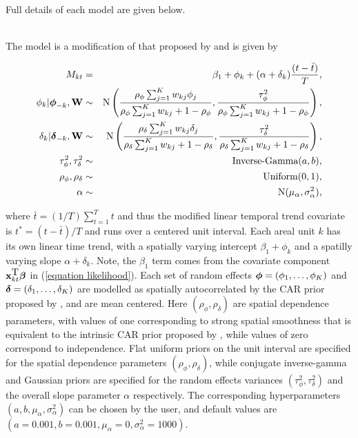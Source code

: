 \documentclass[article,shortnames,nojss]{jss}
\newcommand{\bd}[1]{\ensuremath{\mbox{\boldmath $#1$}}}
\begin{document}
Full details of each model are given below.\vspace{1cm}

\\
The model is a modification of that proposed by \cite{bernardinelli1995} and is given by

\begin{eqnarray}
M_{kt}&=&\beta_{1} + \phi_k + (\alpha + \delta_k)\frac{(t - \bar{t})}{T},\label{carlinear}\\
\phi_k|\bd{\phi}_{-k},\mathbf{W}&\sim&\mbox{N}\left(\frac{\rho_{\phi}\sum_{j=1}^Kw_{kj}\phi_j}{\rho_{\phi}\sum_{j=1}^Kw_{kj} + 1-\rho_{\phi}}, \frac{\tau^2_{\phi}}{\rho_{\phi}\sum_{j=1}^Kw_{kj} + 1-\rho_{\phi}}\right),\nonumber\\
\delta_k|\bd{\delta}_{-k},\mathbf{W}&\sim&\mbox{N}\left(\frac{\rho_{\delta}\sum_{j=1}^Kw_{kj}\delta_j}{\rho_{\delta}\sum_{j=1}^Kw_{kj} + 1-\rho_{\delta}}, \frac{\tau^2_{\delta}}{\rho_{\delta}\sum_{j=1}^Kw_{kj} + 1-\rho_{\delta}}\right),\nonumber\\
\tau^2_{\phi}, \tau^2_{\delta}&\sim&\mbox{Inverse-Gamma}(a,b),\nonumber\\
\rho_{\phi},\rho_{\delta}&\sim&\mbox{Uniform}(0,1),\nonumber\\
\alpha&\sim&\mbox{N}(\mu_{\alpha}, \sigma^2_{\alpha}),\nonumber
\end{eqnarray}

where $\bar{t}=(1/T)\sum_{t=1}^T t$ and thus the modified linear temporal trend covariate is $t^{*}=(t - \bar{t})/T$ and runs over a centered unit interval.  Each areal unit $k$ has its own linear time trend, with a spatially varying intercept $\beta_{1}+\phi_{k}$ and a spatilly varying slope $\alpha+\delta_{k}$. Note, the $\beta_1$ term comes from the covariate component $\mathbf{x}_{kt}^{\mbox{T}}\bd{\beta}$ in (\ref{equation likelihood}). Each set of random effects $\bd{\phi}=(\phi_1,\ldots,\phi_K)$ and  $\bd{\delta}=(\delta_1,\ldots,\delta_K)$ are modelled as spatially autocorrelated by the CAR prior proposed by \cite{leroux1999}, and are mean centered. Here $(\rho_{\phi}, \rho_{\delta})$ are spatial dependence parameters, with values of one corresponding to strong spatial smoothness that is equivalent to the intrinsic CAR prior proposed by  \cite{besag1991}, while values of zero correspond to independence. Flat uniform priors on the unit interval are specified for the spatial dependence parameters $(\rho_{\phi}, \rho_{\delta})$, while conjugate inverse-gamma and Gaussian priors are specified for the random effects variances $(\tau^2_{\phi}, \tau^2_{\delta})$ and the overall slope parameter $\alpha$ respectively. The corresponding hyperparameters $(a, b, \mu_{\alpha}, \sigma^2_{\alpha})$ can be chosen by the user, and default values are $(a=0.001, b=0.001, \mu_{\alpha}=0, \sigma^2_{\alpha}=1000)$.\vspace{1cm}
\end{document}
